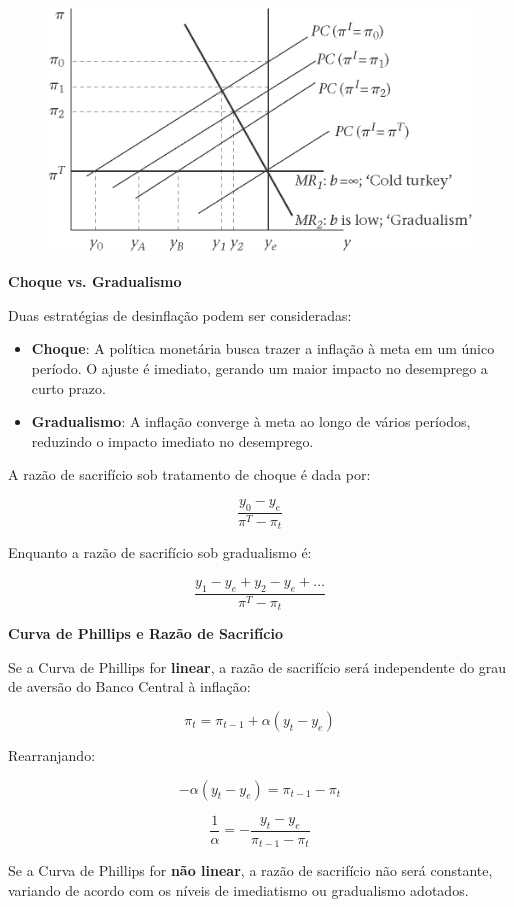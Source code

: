 \documentclass[a4paper,12pt]{article}[abntex2]
\begin{document}
\begin{figure}[H]
    \centering
    \includegraphics[width=0.7\linewidth]{Imagens/a13i5.png}
\end{figure}

\textbf{Choque vs. Gradualismo}

Duas estratégias de desinflação podem ser consideradas:\begin{itemize}
    \item \textbf{Choque}: A política monetária busca trazer a inflação à meta em um único período. O ajuste é imediato, gerando um maior impacto no desemprego a curto prazo.
    \item \textbf{Gradualismo}: A inflação converge à meta ao longo de vários períodos, reduzindo o impacto imediato no desemprego.
\end{itemize}

A razão de sacrifício sob tratamento de choque é dada por:

\[
\frac{y_0 - y_e}{\pi^T - \pi_t}
\]

Enquanto a razão de sacrifício sob gradualismo é:

\[
\frac{y_1 - y_e + y_2 - y_e + \dots}{\pi^T - \pi_t}
\]

\textbf{Curva de Phillips e Razão de Sacrifício}

Se a Curva de Phillips for \textbf{linear}, a razão de sacrifício será independente do grau de aversão do Banco Central à inflação:

\[
\pi_t = \pi_{t-1} + \alpha (y_t - y_e)
\]

Rearranjando:

\[
-\alpha (y_t - y_e) = \pi_{t-1} - \pi_t
\]

\[
\frac{1}{\alpha} = - \frac{y_t - y_e}{\pi_{t-1} - \pi_t}
\]

Se a Curva de Phillips for \textbf{não linear}, a razão de sacrifício não será constante, variando de acordo com os níveis de imediatismo ou gradualismo adotados.
\end{document}
